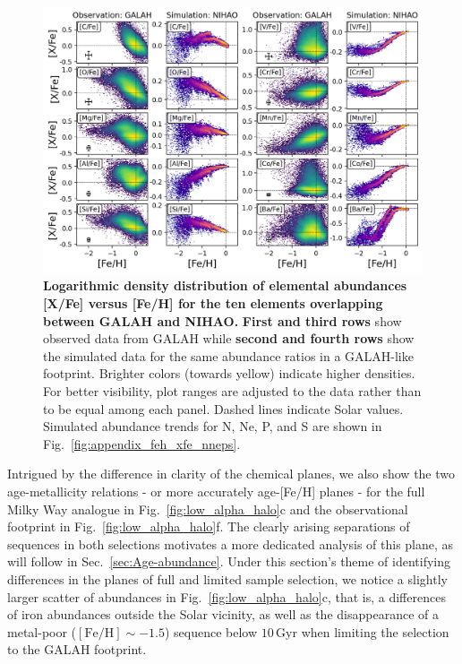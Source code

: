 \documentclass[fleqn,usenatbib]{mnras}
\begin{document}
\begin{figure}
	\includegraphics[width=\textwidth]{figures/Overview_FeH_XFe_Obs_Sim.png}
    \caption{
    \textbf{Logarithmic density distribution of elemental abundances [X/Fe] versus [Fe/H] for the ten elements overlapping between GALAH and NIHAO.} 
    \textbf{First and third rows} show observed data from GALAH while \textbf{second and fourth rows} show the simulated data for the same abundance ratios in a GALAH-like footprint. Brighter colors (towards yellow) indicate higher densities. For better visibility, plot ranges are adjusted to the data rather than to be equal among each panel. Dashed lines indicate Solar values. Simulated abundance trends for N, Ne, P, and S are shown in Fig.~\ref{fig:appendix_feh_xfe_nneps}.}
    \label{fig:FeH_XFe}
\end{figure}

Intrigued by the difference in clarity of the chemical planes, we also show the two age-metallicity relations - or more accurately age-[Fe/H] planes - for the full Milky Way analogue in Fig.~\ref{fig:low_alpha_halo}c and the observational footprint in Fig.~\ref{fig:low_alpha_halo}f. The clearly arising separations of sequences in both selections motivates a more dedicated analysis of this plane, as will follow in Sec.~\ref{sec:Age-abundance}. Under this section's theme of identifying differences in the planes of full and limited sample selection, we notice a slightly larger scatter of abundances in Fig.~\ref{fig:low_alpha_halo}c, that is, a differences of iron abundances outside the Solar vicinity, as well as the disappearance of a metal-poor ($\mathrm{[Fe/H]} \sim -1.5$) sequence below $10\,\mathrm{Gyr}$ when limiting the selection to the GALAH footprint.
\end{document}
